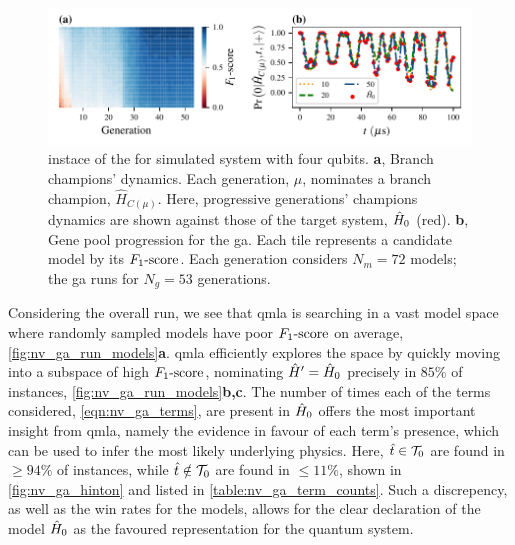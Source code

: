 \begin{figure}
    \begin{center}
        \includegraphics{experimental_study/figures/nv_ga_instance_horiz.pdf}
    \end{center}
    \caption[\Gls{instance} of  for simulated  system with four qubits]{
        \Gls{instace} of the  for simulated  system with four qubits.       
        \textbf{a}, Branch champions' dynamics. 
        Each generation, $\mu$, nominates a branch champion, $\hat{H}_{C(\mu)}$. 
        Here, progressive generations' champions dynamics are shown against those of the target system, $\hat{H}_0$ (red). 
        \textbf{b}, Gene pool progression for the \gls{ga}. Each tile represents a candidate model by its $ F_{1}\text{-score} $. 
        Each generation considers $N_m=72$ models; the \gls{ga} runs for $N_g=53$ generations. 
    }
    \label{fig:nv_ga_instance}
\end{figure}
\par 

Considering the overall \gls{run}, 
    we see that \gls{qmla} is searching in a vast model space where randomly sampled models
    have poor $ F_{1}\text{-score} $ on average, \cref{fig:nv_ga_run_models}\textbf{a}. 
\gls{qmla} efficiently explores the space by quickly moving into a 
    subspace of high $ F_{1}\text{-score} $, nominating $\hat{H}^{\prime} = \hat{H}_0$ precisely in $85\%$ of instances,
    \cref{fig:nv_ga_run_models}\textbf{b,c}.
The number of times each of the terms considered, \cref{eqn:nv_ga_terms}, 
    are present in $\hat{H}_0$ offers the most important insight from \gls{qmla}, 
    namely the evidence in favour of each term's presence, 
    which can be used to infer the most likely underlying physics. 
Here, $\hat{t} \in { \mathcal{T} }_0$ are found in $\geq 94\%$ of instances, 
    while $\hat{t} \notin { \mathcal{T} }_0$ are found in $\leq 11\%$, 
    shown in \cref{fig:nv_ga_hinton} and listed in \cref{table:nv_ga_term_counts}.
Such a discrepency, as well as the win rates for the models, 
    allows for the clear declaration of the model $\hat{H}_0$ as the favoured representation 
    for the quantum system. 


